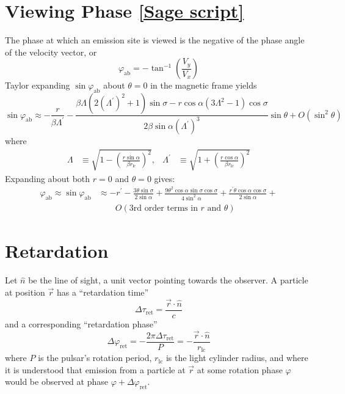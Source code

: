 \documentclass{book}
\newcommand{\phase}{\varphi}
\newcommand{\rL}{r_\text{lc}} %
\newcommand{\linktosage}[1]{\hyperref[#1]{[Sage script]}}
\begin{document}
\section{Viewing Phase \linktosage{sage:phase}}

The phase at which an emission site is viewed is the negative of the phase angle of the velocity vector, or
\begin{equation}
    \phase_\text{ab} = -\tan^{-1}\left(\frac{V_y}{V_x}\right)
\end{equation}
Taylor expanding $\sin\phase_\text{ab}$ about $\theta = 0$ in the magnetic frame yields
\begin{equation}
    \sin\phase_\text{ab} \approx
        -\frac{r}{\beta\Lambda^\prime} -
            \frac{\beta\Lambda(2(\Lambda^\prime)^2+1)\sin\sigma - r\cos\alpha(3\Lambda^2-1)\cos\sigma}{
                  2\beta\sin\alpha(\Lambda^\prime)^3}\sin\theta + O(\sin^2\theta)
\end{equation}
where
\begin{align}
    \Lambda &\equiv \sqrt{1-\left(\frac{r\sin\alpha}{\beta \rL}\right)^2}, &
    \Lambda^\prime &\equiv \sqrt{1+\left(\frac{r\cos\alpha}{\beta \rL}\right)^2}
\end{align}
Expanding about both $r = 0$ and $\theta = 0$ gives:
\begin{equation}
    \begin{aligned}
        \phase_\text{ab} \approx \sin\phase_\text{ab} &\approx
            -r^\prime - \frac{3\theta\sin\sigma}{2\sin\alpha} +
            \frac{9\theta^2\cos\alpha\sin\sigma\cos\sigma}{4\sin^2\alpha} +
            \frac{r^\prime\theta\cos\alpha\cos\sigma}{2\sin\alpha} + \\
            &\qquad O(\text{3rd order terms in $r$ and $\theta$})
    \end{aligned}
\end{equation}

\section{Retardation}

Let $\hat{n}$ be the line of sight, a unit vector pointing towards the observer.
A particle at position $\vec{r}$ has a ``retardation time''
\begin{equation}
    \Delta\tau_\text{ret} = \frac{\vec{r}\cdot\hat{n}}{c}
\end{equation}
and a corresponding ``retardation phase''
\begin{equation}
    \Delta\phase_\text{ret} = -\frac{2\pi\Delta\tau_\text{ret}}{P} = -\frac{\vec{r}\cdot\hat{n}}{\rL}
\end{equation}
where $P$ is the pulsar's rotation period, $\rL$ is the light cylinder radius, and where it is understood that emission from a particle at $\vec{r}$ at some rotation phase $\phase$ would be observed at phase $\phase + \Delta\phase_\text{ret}$.
\end{document}

